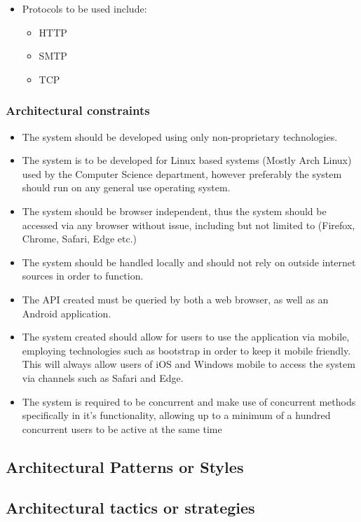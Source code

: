 \documentclass{article}
\begin{document}
		\begin{itemize}
			\item Protocols to be used include:
			\begin{itemize}
				\item HTTP
				\item SMTP
				\item TCP
			\end{itemize}
		\end{itemize}
		
		\subsubsection{Architectural constraints}\label{subsubsec:constraints}
		\begin{itemize}
			\item The system should be developed using only non-proprietary technologies.
			\item The system is to be developed for Linux based systems (Mostly Arch Linux) used by the Computer Science department, however preferably the system should run on any general use operating system.
			\item The system should be browser independent, thus the system should be accessed via any browser without issue, including but not limited to (Firefox, Chrome, Safari, Edge etc.)
			\item The system should be handled locally and should not rely on outside internet sources in order to function.
			\item The API created must be queried by both a web browser, as well as an Android application.
			\item The system created should allow for users to use the application via mobile, employing technologies such as bootstrap in order to keep it mobile friendly. This will always allow users of iOS and Windows mobile to access the system via channels such as Safari and Edge.
			\item The system is required to be concurrent and make use of concurrent methods specifically in it's functionality, allowing up to a minimum of a hundred concurrent users to be active at the same time
		\end{itemize}
		
		\subsection{Architectural Patterns or Styles}
		\subsection{Architectural tactics or strategies}
		
\end{document}
